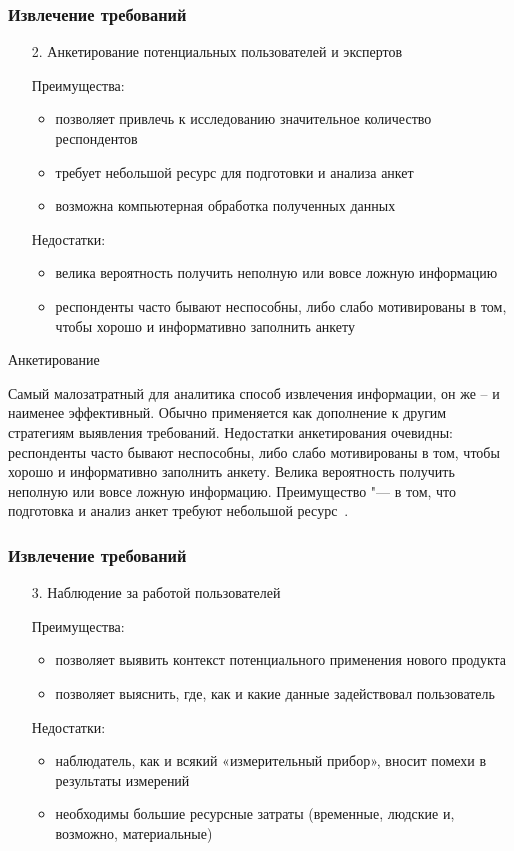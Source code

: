 \documentclass{../industrial-development}
\begin{document}
\begin{frame} \frametitle{Извлечение требований}
\begin{itemize} 
\item[2.] Анкетирование потенциальных пользователей и экспертов

Преимущества: 
\begin{itemize} 
\item позволяет привлечь к исследованию значительное количество респондентов
\item требует небольшой ресурс для подготовки и анализа анкет
\item возможна компьютерная обработка полученных данных
\end{itemize}

Недостатки:
\begin{itemize}  
\item велика вероятность получить неполную или вовсе ложную информацию
\item респонденты часто бывают неспособны, либо слабо мотивированы в том, чтобы хорошо и информативно заполнить анкету
\end{itemize}
\end{itemize}

\end{frame}

\lecturenotes

\alert{Анкетирование}

Самый малозатратный для аналитика способ извлечения информации, он же – и наименее эффективный. Обычно применяется как дополнение к другим стратегиям выявления требований.
Недостатки анкетирования очевидны: респонденты часто бывают неспособны, либо слабо мотивированы в том, чтобы хорошо и информативно заполнить анкету. Велика вероятность получить неполную или вовсе ложную информацию. Преимущество "--- в том, что подготовка и анализ анкет требуют небольшой ресурс~\cite[с.~32]{Maglinec}.

\begin{frame} \frametitle{Извлечение требований}
\begin{itemize} 
\item[3.] Наблюдение за работой пользователей

Преимущества: 
\begin{itemize}
\item позволяет выявить контекст потенциального применения нового продукта
\item позволяет выяснить, где, как и какие данные задействовал пользователь
\end{itemize}
Недостатки: 
\begin{itemize}
\item наблюдатель, как и всякий «измерительный прибор», вносит помехи в результаты измерений
\item необходимы большие ресурсные затраты (временные, людские и, возможно, материальные)
\end{itemize}

\end{itemize} 

\end{frame}
\end{document}
